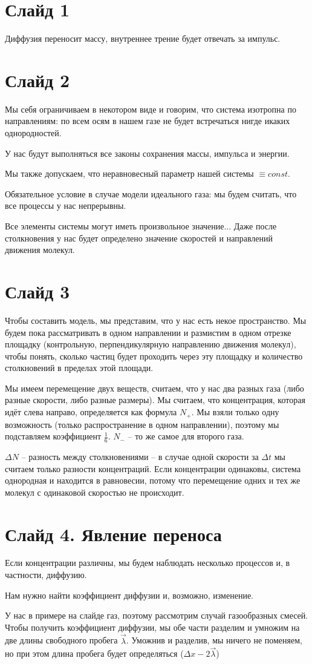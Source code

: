 \documentclass[12pt]{article}
\begin{document}
\section{Слайд 1}
\par Диффузия переносит массу, внутреннее трение будет отвечать за импульс.
\section{Слайд 2}
\par Мы себя ограничиваем в некотором виде и говорим, что система изотропна по направлениям: по всем осям в нашем газе не будет встречаться нигде икаких однородностей.
\par У нас будут выполняться все законы сохранения массы, импульса и энергии.
\par Мы также допускаем, что неравновесный параметр нашей системы $\equiv const$.
\par Обязательное условие в случае модели идеального газа: мы будем считать, что все процессы у нас непрерывны.
\par Все элементы системы могут иметь произвольное значение... Даже после столкновения у нас будет определено значение скоростей и направлений движения молекул.
\section{Слайд 3}
Чтобы составить модель, мы представим, что у нас есть некое пространство. Мы будем пока рассматривать в одном направлении и размистим в одном отрезке площадку (контрольную, перпендикулярную направлению движения молекул), чтобы понять, сколько частиц будет проходить через эту площадку и количество столкновений в пределах этой площади.
\par Мы имеем перемещение двух веществ, считаем, что у нас два разных газа (либо разные скорости, либо разные размеры). Мы считаем, что концентрация, которая идёт слева направо, определяется как формула $N_+$. Мы взяли только одну возможность (только распространение в одном направлении), поэтому мы подставляем коэффициент $\frac 1 6$. $N_-$ -- то же самое для второго газа.
\par $\Delta N$ -- разность между столкновениями -- в случае одной скорости за $\Delta t$ мы считаем только разности концентраций. Если концентрации одинаковы, система однородная и находится в равновесии, потому что перемещение одних и тех же молекул с одинаковой скоростью не происходит.
\section{Слайд 4. Явление переноса}
\par Если концентрации различны, мы будем наблюдать несколько процессов и, в частности, диффузию.
\par Нам нужно найти коэффициент диффузии и, возможно, изменение.
\par У нас в примере на слайде газ, поэтому рассмотрим случай газообразных смесей. Чтобы получить коэффициент диффузии, мы обе части разделим и умножим на две длины свободного пробега $\vec \lambda$. Уможнив и разделив, мы ничего не поменяем, но при этом длина пробега будет определяться ($\Delta x - 2 \vec \lambda$)
\end{document}
